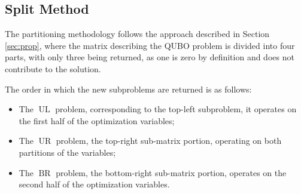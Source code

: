 \subsection{Split Method}\label{sec:split}

The partitioning methodology follows the approach described in Section \ref{sec:prop}, where the matrix describing the QUBO problem is divided into four parts, with only three being returned, as one is zero by definition and does not contribute to the solution.

The order in which the new subproblems are returned is as follows: 
\begin{itemize} 
	\item The $\operatorname{UL}$ problem, corresponding to the top-left subproblem, it operates on the first half of the optimization variables; 
	\item The $\operatorname{UR}$ problem, the top-right sub-matrix portion, operating on both partitions of the variables; 
	\item The $\operatorname{BR}$ problem, the bottom-right sub-matrix portion, operates on the second half of the optimization variables. 
\end{itemize}

